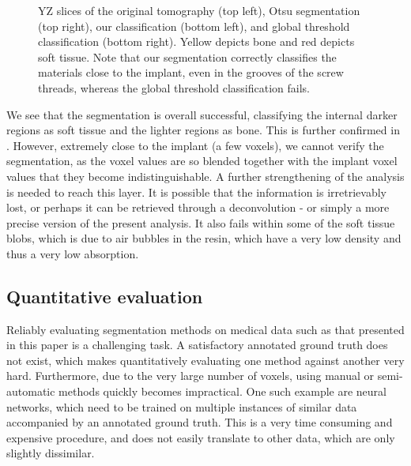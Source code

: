 \begin{figure}
\begin{tabular}{cc}
    \end{tabular}
    \caption{
	    YZ slices of the original tomography (top left), Otsu segmentation
	    (top right), our classification (bottom left), and global threshold
	    classification (bottom right).  Yellow depicts bone and red depicts
	    soft tissue. Note that our segmentation correctly classifies the
	    materials close to the implant, even in the grooves of the screw
	    threads, whereas the global threshold classification fails.
    }
    \label{fig:histology-comparison2}
\end{figure}

We see that the segmentation is overall successful, classifying the internal
darker regions as soft tissue and the lighter regions as bone. This is further
confirmed in . However, extremely close to the implant
(a few voxels), we cannot verify the segmentation, as the voxel values are so
blended together with the implant voxel values that they become
indistinguishable. A further strengthening of the analysis is needed to reach
this layer. It is possible that the information is irretrievably lost, or
perhaps it can be retrieved through a deconvolution - or simply a more precise
version of the present analysis. It also fails within some of the soft tissue
blobs, which is due to air bubbles in the resin, which have a very low density
and thus a very low absorption.

\subsection{Quantitative evaluation}

Reliably evaluating segmentation methods on medical data such as that
presented in this paper is a challenging task. A satisfactory annotated ground
truth does not exist, which makes quantitatively evaluating one method against
another very hard. Furthermore, due to the very large number of voxels, using
manual or semi-automatic methods quickly becomes impractical. One such example
are neural networks, which need to be trained on multiple instances of similar
data accompanied by an annotated ground truth. This is a very time consuming
and expensive procedure, and does not easily translate to other data, which are
only slightly dissimilar.

